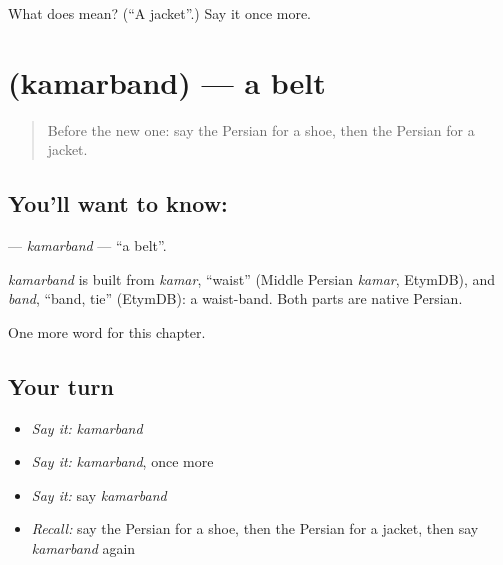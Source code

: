 \begin{tcolorbox}[breakable,colback=teal!4,colframe=teal!35!black,title={Before you move on}]
What does  mean? (\textquotedblleft{}A jacket\textquotedblright{}.) Say it once more.
\end{tcolorbox}
\section[\texorpdfstring{\fa{کمربند} (kamarband)}{کمربند (kamarband)}]{ (kamarband) — a belt}

\label{lesson:FA-C75-kamarband}



\begin{quote}
Before the new one: say the Persian for a shoe, then the Persian for a jacket.
\end{quote}

\subsection*{You'll want to know: }
\textbf{} — \emph{kamarband} — \textquotedblleft{}a belt\textquotedblright{}.

\begin{cousinweb}
\emph{kamarband} is built from \emph{kamar}, \textquotedblleft{}waist\textquotedblright{} (Middle Persian \emph{kamar}, EtymDB), and \emph{band}, \textquotedblleft{}band, tie\textquotedblright{} (EtymDB): a waist-band. Both parts are native Persian.
\end{cousinweb}

\begin{grammarlens}[title={What you've built}]
One more word for this chapter.
\end{grammarlens}

\subsection*{Your turn}
\begin{itemize}
\raggedright
  \item \emph{Say it:} \emph{kamarband}
  \item \emph{Say it:} \emph{kamarband}, once more
  \item \emph{Say it:} say \emph{kamarband}
  \item \emph{Recall:} say the Persian for a shoe, then the Persian for a jacket, then say \emph{kamarband} again
\end{itemize}

